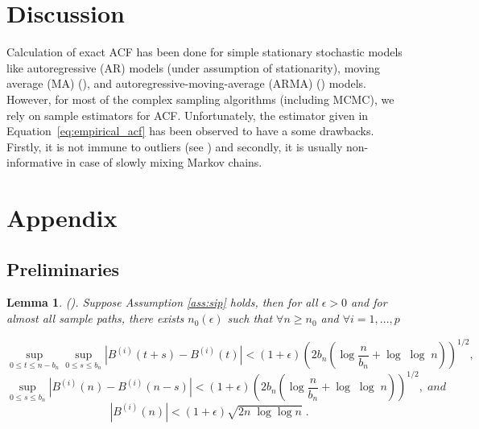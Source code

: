 \documentclass[11pt]{article}
\newtheorem{lemma}{Lemma}
\theoremstyle{remark}
\begin{document}
\section{Discussion} \label{sec:discussion}

Calculation of exact ACF has been done for simple stationary stochastic models like autoregressive (AR) models (under assumption of stationarity), moving average (MA) (\cite{quenouille1947notes}), and autoregressive-moving-average (ARMA) (\cite{box2015time}) models. However, for most of the complex sampling algorithms (including MCMC), we rely on sample estimators for ACF. Unfortunately, the estimator given in Equation~\ref{eq:empirical_acf} has been observed to have a some drawbacks. Firstly, it is not immune to outliers (see \cite{ma2000highly}) and secondly, it is usually non-informative in case of slowly mixing Markov chains. 

\appendix

\section{Appendix}  \label{sec:appendix}
\subsection{Preliminaries} \label{apdx:preliminaries}

\begin{lemma}
\label{lemma: brownian}
(\cite{csorgo2014strong}). Suppose Assumption \ref{ass:sip} holds, then for all $\epsilon > 0$ and for almost all sample paths, there exists $n_{0}\left(\epsilon\right)$ such that $\forall n\geq n_{0}$ and $\forall i = 1, ..., p$

\[
\sup_{0\leq t \leq n-b_n}\sup_{0 \leq s \leq b_n} \left| B^{\left(i\right)}\left(t+s\right) - B^{\left(i\right)}\left(t\right) \right| < \left(1+ \epsilon\right)\left(2b_n\left(\log\dfrac{n}{b_n} + \log\; \log\; n\right)\right)^{1/2} ,
\]
%
\[
\sup_{0 \leq s \leq b_n} \left|B^{\left(i\right)}\left(n\right) - B^{\left(i\right)}\left(n - s\right)\right| < \left(1+ \epsilon\right)\left(2b_n\left(\log\dfrac{n}{b_n} + \log\;\log\;n\right)\right)^{1/2} , \;and
\]
%
\[
\left|B^{\left(i\right)}\left(n\right)\right| < \left(1+\epsilon\right)\sqrt{2n\;\log \log n} \; . 
\]
\end{lemma}


\end{document}
